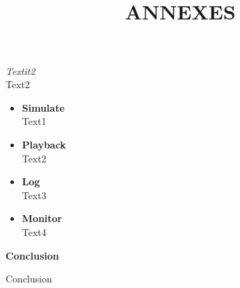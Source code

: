 \documentclass[a4paper]{report}
\begin{document}
	\textit{Textit2}\\
	Text2 \\

\vspace{2cm}

	\begin{itemize}
		\item \textbf{Simulate}\\
			Text1
		\item \textbf{Playback}\\
			Text2
		\item \textbf{Log}\\
			Text3
		\item \textbf{Monitor}\\
			Text4
	\end{itemize}

\newpage

	\begin{center}
	\textbf{\LARGE{Conclusion}}
	\end{center}

\vspace{5cm}

Conclusion

\newpage
\nocite{*}






\newpage

	\begin{center}
		\title{ \HRule{} \\ [12cm]
				\LARGE \textbf{\uppercase{Annexes}}\\ [12cm]
				\HRule{}}
		\maketitle
	\end{center}
\end{document}
